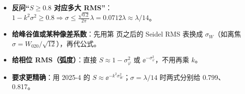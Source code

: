 \begin{warn}[变式]
\begin{itemize}
\item \textbf{反问“$S\ge0.8$ 对应多大 RMS”}：$1-k^2\sigma^2\ge0.8\Rightarrow\sigma\le\frac{\sqrt{0.2}}{2\pi}\lambda=0.0712\lambda\approx\lambda/14$。
\item \textbf{给峰谷值或某种像差系数}：先用第 \pageref{sec:strehl} 页之后的 Seidel RMS 表换成 $\sigma_W$（如离焦 $\sigma=W_{020}/\sqrt{12}$），再代公式。
\item \textbf{给相位 RMS（弧度）}：直接 $S\approx1-\sigma_\varphi^2$ 或 $\ee^{-\sigma_\varphi^2}$，不用再乘 $k$。
\item \textbf{要求更精确}：用 2025-4 的 $S\approx\ee^{-k^2\sigma_W^2}$；$\sigma=\lambda/14$ 时两式分别给 0.799、0.817。
\end{itemize}
\end{warn}

